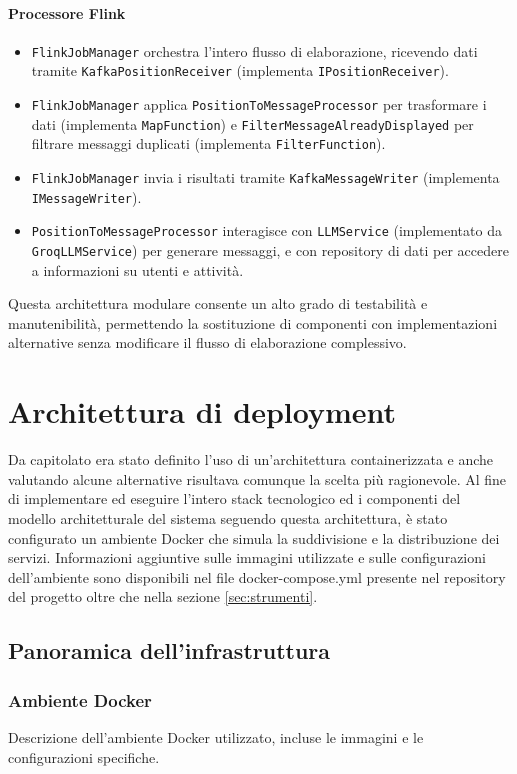 \documentclass[10pt]{article}
\begin{document}
    \paragraph{Processore Flink}
    \begin{itemize}
        \item \texttt{FlinkJobManager} orchestra l'intero flusso di elaborazione, ricevendo dati tramite \texttt{KafkaPositionReceiver} (implementa \texttt{IPositionReceiver}).
        \item \texttt{FlinkJobManager} applica \texttt{PositionToMessageProcessor} per trasformare i dati (implementa \texttt{MapFunction}) e \texttt{FilterMessageAlreadyDisplayed} per filtrare messaggi duplicati (implementa \texttt{FilterFunction}).
        \item \texttt{FlinkJobManager} invia i risultati tramite \texttt{KafkaMessageWriter} (implementa \texttt{IMessageWriter}).
        \item \texttt{PositionToMessageProcessor} interagisce con \texttt{LLMService} (implementato da \texttt{GroqLLMService}) per generare messaggi, e con repository di dati per accedere a informazioni su utenti e attività.
    \end{itemize}

    Questa architettura modulare consente un alto grado di testabilità e manutenibilità, permettendo la sostituzione di componenti con implementazioni alternative senza modificare il flusso di elaborazione complessivo.

\section{Architettura di deployment}
Da capitolato era stato definito l'uso di un'architettura containerizzata e anche valutando alcune alternative risultava comunque la scelta più ragionevole. Al fine di implementare ed eseguire l'intero stack tecnologico ed i componenti del modello architetturale del sistema seguendo questa architettura, è stato configurato un ambiente Docker che simula la suddivisione e la distribuzione dei servizi. Informazioni aggiuntive sulle immagini utilizzate e sulle configurazioni dell'ambiente sono disponibili nel file docker-compose.yml presente nel repository del progetto oltre che nella sezione \ref{sec:strumenti}.
    \subsection{Panoramica dell'infrastruttura}
        \subsubsection{Ambiente Docker}
        Descrizione dell'ambiente Docker utilizzato, incluse le immagini e le configurazioni specifiche.
\end{document}
